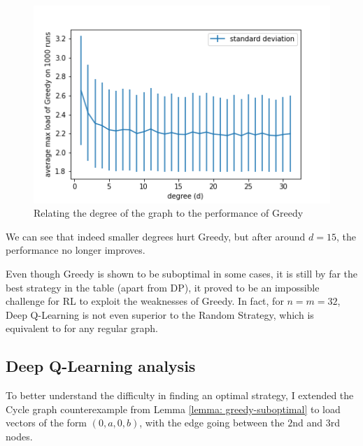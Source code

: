 \begin{figure}[hbt!] \label{greedy-random-regular-analysis}
    \centering
    \includegraphics[scale=1.0]{Chapter4/Figs/Greedy_degree_analysis.png}
    \caption{Relating the degree of the graph to the performance of Greedy}
\end{figure}


We can see that indeed smaller degrees hurt Greedy, but after around $d=15$, the performance no longer improves. 



Even though Greedy is shown to be suboptimal in some cases, it is still by far the best strategy in the table (apart from DP), it proved to be an impossible challenge for RL to exploit the weaknesses of Greedy. In fact, for $n=m=32$, Deep Q-Learning is not even superior to the Random Strategy, which is equivalent to \OneChoice for any regular graph.


\subsection{Deep Q-Learning analysis}

To better understand the difficulty in finding an optimal strategy, I extended the Cycle graph counterexample from Lemma \ref{lemma: greedy-suboptimal} to load vectors of the form $(0, a, 0, b)$, with the edge going between the $2$nd and $3$rd nodes. 


